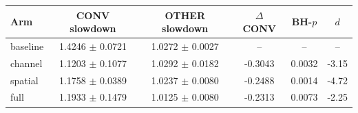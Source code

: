 \begin{tabular}{lccccc}
\toprule
Arm & CONV slowdown & OTHER slowdown & $\Delta$ CONV & BH-$p$ & $d$ \\
\midrule
baseline & 1.4246 $\pm$ 0.0721 & 1.0272 $\pm$ 0.0027 & -- & -- & -- \\
channel & 1.1203 $\pm$ 0.1077 & 1.0292 $\pm$ 0.0182 & -0.3043 & 0.0032 & -3.15 \\
spatial & 1.1758 $\pm$ 0.0389 & 1.0237 $\pm$ 0.0080 & -0.2488 & 0.0014 & -4.72 \\
full & 1.1933 $\pm$ 0.1479 & 1.0125 $\pm$ 0.0080 & -0.2313 & 0.0073 & -2.25 \\
\bottomrule
\end{tabular}
